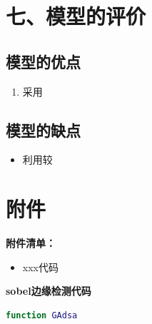 \documentclass{my_paper}
\begin{document}
\section{七、模型的评价}

\subsection{模型的优点}
\begin{enumerate}
    \item 采用

\end{enumerate}

\subsection{模型的缺点}
\begin{itemize}
    \item 利用较

\end{itemize}

\newpage
\begin{center}
\end{center}

\newpage
\section{附件}
\textbf{附件清单：}
\renewcommand\theenumi{\roman{enumi}}
\renewcommand\labelenumi{\textbf{附录\theenumi}}
\begin{itemize}
    \item xxx代码
\end{itemize}

\textbf{sobel边缘检测代码}

\begin{lstlisting}[language=matlab]
    function GAdsa 
\end{lstlisting}
\end{document}
